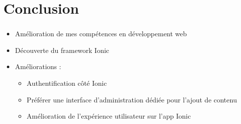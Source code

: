 \documentclass[10pt]{beamer}
\begin{document}
\section{Conclusion}
\begin{frame}
	\frametitle{\secname}
	\begin{itemize}
        \item Amélioration de mes compétences en développement web
        \item Découverte du framework Ionic
        \item Améliorations :
        \begin{itemize}
            \item Authentification côté Ionic
            \item Préférer une interface d'administration dédiée pour l'ajout de contenu
            \item Amélioration de l'expérience utilisateur sur l'app Ionic
        \end{itemize}
    \end{itemize}
\end{frame}
\end{document}
